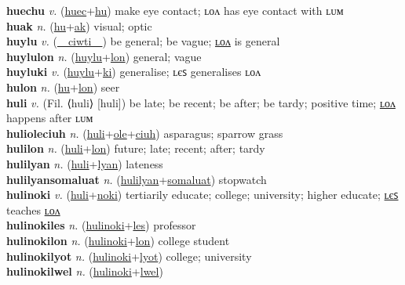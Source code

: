 \textbf{huechu} \textit{v.} (\hyperref[huec]{huec}+\hyperref[hu]{hu})
make eye contact; ʟᴏᴧ has eye contact with ʟᴜᴍ \label{huechu} \\
\textbf{huak} \textit{n.} (\hyperref[hu]{hu}+\hyperref[ak]{ak})
visual; optic \label{huak} \\
\textbf{huylu} \textit{v.} (\hyperref[ciwti]{~~ciwti~~})
be general; be vague; \hyperref[huylulon]{ʟᴏᴧ} is general \label{huylu} \\
\textbf{huylulon} \textit{n.} (\hyperref[huylu]{huylu}+\hyperref[lon]{lon})
general; vague \label{huylulon} \\
\textbf{huyluki} \textit{v.} (\hyperref[huylu]{huylu}+\hyperref[ki]{ki})
generalise; ʟєꜱ generalises ʟᴏᴧ \label{huyluki} \\
\textbf{hulon} \textit{n.} (\hyperref[hu]{hu}+\hyperref[lon]{lon})
seer \label{hulon} \\
\textbf{huli} \textit{v.} (Fil. ⟨huli⟩ [huli])
be late; be recent; be after; be tardy; positive time; \hyperref[hulilon]{ʟᴏᴧ} happens after ʟᴜᴍ \label{huli} \\
\textbf{hulioleciuh} \textit{n.} (\hyperref[huli]{huli}+\hyperref[ole]{ole}+\hyperref[ciuh]{ciuh})
asparagus; sparrow grass \label{hulioleciuh} \\
\textbf{hulilon} \textit{n.} (\hyperref[huli]{huli}+\hyperref[lon]{lon})
future; late; recent; after; tardy \label{hulilon} \\
\textbf{hulilyan} \textit{n.} (\hyperref[huli]{huli}+\hyperref[lyan]{lyan})
lateness \label{hulilyan} \\
\textbf{hulilyansomaluat} \textit{n.} (\hyperref[hulilyan]{hulilyan}+\hyperref[somaluat]{somaluat})
stopwatch \label{hulilyansomaluat} \\
\textbf{hulinoki} \textit{v.} (\hyperref[huli]{huli}+\hyperref[noki]{noki})
tertiarily educate; college; university; higher educate; \hyperref[hulinokiles]{ʟєꜱ} teaches \hyperref[hulinokilon]{ʟᴏᴧ} \label{hulinoki} \\
\textbf{hulinokiles} \textit{n.} (\hyperref[hulinoki]{hulinoki}+\hyperref[les]{les})
professor \label{hulinokiles} \\
\textbf{hulinokilon} \textit{n.} (\hyperref[hulinoki]{hulinoki}+\hyperref[lon]{lon})
college student \label{hulinokilon} \\
\textbf{hulinokilyot} \textit{n.} (\hyperref[hulinoki]{hulinoki}+\hyperref[lyot]{lyot})
college; university \label{hulinokilyot} \\
\textbf{hulinokilwel} \textit{n.} (\hyperref[hulinoki]{hulinoki}+\hyperref[lwel]{lwel})
